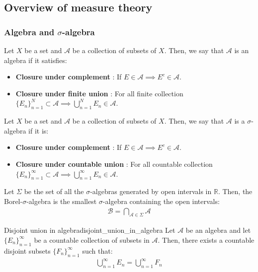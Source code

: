 \subsection{Overview of measure theory}
\subsubsection{Algebra and $\sigma$-algebra}
\begin{definition}[Algebra]
    Let $X$ be a set and $\mathcal{A}$ be a collection of subsets of $X$. Then, we say that $\mathcal{A}$ is an algebra if it satisfies:
    \begin{itemize}
        \item \textbf{Closure under complement} : If $E \in \mathcal{A} \implies E^c \in \mathcal{A}$.
        \item \textbf{Closure under finite union} : For all finite collection $\{E_n\}_{n=1}^N\subset \mathcal{A} \implies \bigcup_{n=1}^N E_n \in \mathcal{A}$.
    \end{itemize}
\end{definition}

\begin{definition}
    Let $X$ be a set and $\mathcal{A}$ be a collection of subsets of $X$. Then, we say that $\mathcal{A}$ is a $\sigma$-algebra if it is:
    \begin{itemize}
        \item \textbf{Closure under complement} : If $E \in \mathcal{A} \implies E^c \in \mathcal{A}$.
        \item \textbf{Closure under countable union} : For all countable collection $\{E_n\}_{n=1}^\infty\subset \mathcal{A} \implies \bigcup_{n=1}^\infty E_n \in \mathcal{A}$.
    \end{itemize}
\end{definition}

\begin{definition}
    Let $\Sigma$ be the set of all the $\sigma$-algebras generated by open intervals in $\mathbb{R}$. Then, the Borel-$\sigma$-algebra is the smallest $\sigma$-algebra containing the open intervals:
    \begin{align*}
        \mathcal{B} = \bigcap_{\mathcal{A}\in\Sigma} \mathcal{A}
    \end{align*}
\end{definition}

\begin{proposition}{Disjoint union in algebra}{disjoint_union_in_algebra}
    Let $\mathcal{A}$ be an algebra and let $\{E_n\}_{n=1}^\infty$ be a countable collection of subsets in $\mathcal{A}$. Then, there exists a countable disjoint subsets $\{F_n\}_{n=1}^\infty$ such that:
    \begin{align*}
        \bigcup_{n=1}^\infty E_n = \bigcup_{n=1}^\infty F_n
    \end{align*}
\end{proposition}

